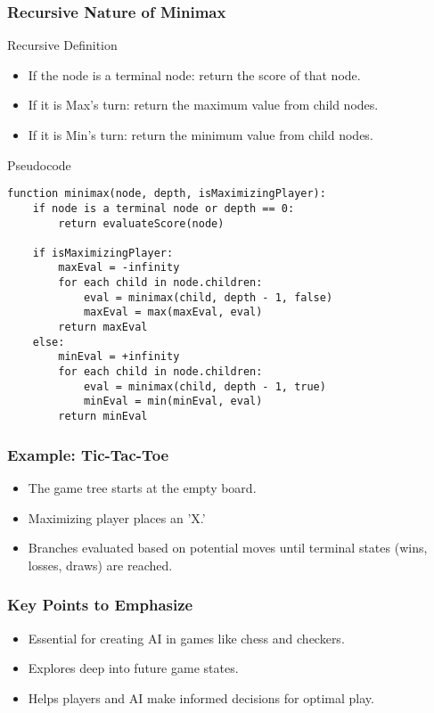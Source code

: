 \documentclass[aspectratio=169]{beamer}
\begin{document}
\begin{frame}[fragile]
    \frametitle{Recursive Nature of Minimax}
    \begin{block}{Recursive Definition}
        \begin{itemize}
            \item If the node is a terminal node: return the score of that node.
            \item If it is Max's turn: return the maximum value from child nodes.
            \item If it is Min's turn: return the minimum value from child nodes.
        \end{itemize}
    \end{block}
    
    \begin{block}{Pseudocode}
    \begin{lstlisting}
function minimax(node, depth, isMaximizingPlayer):
    if node is a terminal node or depth == 0:
        return evaluateScore(node)

    if isMaximizingPlayer:
        maxEval = -infinity
        for each child in node.children:
            eval = minimax(child, depth - 1, false)
            maxEval = max(maxEval, eval)
        return maxEval
    else:
        minEval = +infinity
        for each child in node.children:
            eval = minimax(child, depth - 1, true)
            minEval = min(minEval, eval)
        return minEval
    \end{lstlisting}
    \end{block}
\end{frame}

\begin{frame}
    \frametitle{Example: Tic-Tac-Toe}
    \begin{itemize}
        \item The game tree starts at the empty board.
        \item Maximizing player places an 'X.'
        \item Branches evaluated based on potential moves until terminal states (wins, losses, draws) are reached.
    \end{itemize}
\end{frame}

\begin{frame}
    \frametitle{Key Points to Emphasize}
    \begin{itemize}
        \item Essential for creating AI in games like chess and checkers.
        \item Explores deep into future game states.
        \item Helps players and AI make informed decisions for optimal play.
    \end{itemize}
\end{frame}
\end{document}
